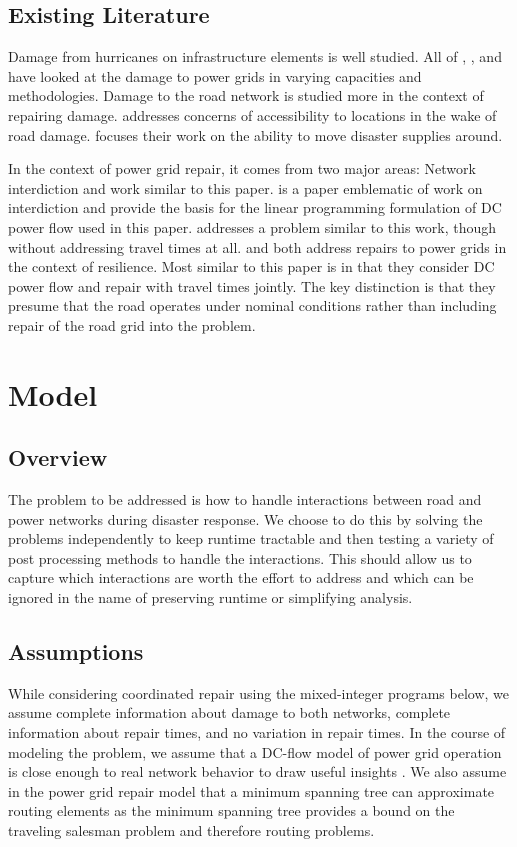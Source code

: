 \documentclass[10pt]{article}
\begin{document}
\subsection{\large Existing Literature}
\vspace*{-12pt}
Damage from hurricanes on infrastructure elements is well studied. All of \cite{WinklerEA2010}, \cite{ScherbEA2015}, and \cite{GuikemaEA2010} have looked at the damage to power grids in varying capacities and methodologies. Damage to the road network is studied more in the context of repairing damage. \cite{AksuEA2014} addresses concerns of accessibility to locations in the wake of road damage. \cite{DuqueEA2016} focuses their work on the ability to move disaster supplies around.

In the context of power grid repair, it comes from two major areas: Network interdiction and work similar to this paper. \cite{SalmeronEA2010} is a paper emblematic of work on interdiction and provide the basis for the linear programming formulation of DC power flow used in this paper.  \cite{NPSMasters} addresses a problem similar to this work, though without addressing travel times at all. \cite{ArabEA2015} and \cite{MousavizadehEA2018} both address repairs to power grids in the context of resilience. Most similar to this paper is \cite{BentEA2011} in that they consider DC power flow and repair with travel times jointly. The key distinction is that they presume that the road operates under nominal conditions rather than including repair of the road grid into the problem.
\vspace*{-12pt}
\section{\large{Model}}
\vspace*{-12pt}
\subsection{Overview}
The problem to be addressed is how to handle interactions between road and power networks during disaster response. We choose to do this by solving the problems independently to keep runtime tractable and then testing a variety of post processing methods to handle the interactions. This should allow us to capture which interactions are worth the effort to address and which can be ignored in the name of preserving runtime or simplifying analysis. 
\subsection{Assumptions}
\vspace*{-12pt}
While considering coordinated repair using the mixed-integer programs below, we assume complete information about damage to both networks, complete information about repair times, and no variation in repair times. In the course of modeling the problem, we assume that a DC-flow model of power grid operation is close enough to real network behavior to draw useful insights \cite{QiEA2012}. We also assume in the power grid repair model that a minimum spanning tree can approximate routing elements as the minimum spanning tree provides a bound on the traveling salesman problem and therefore routing problems.
\end{document}
